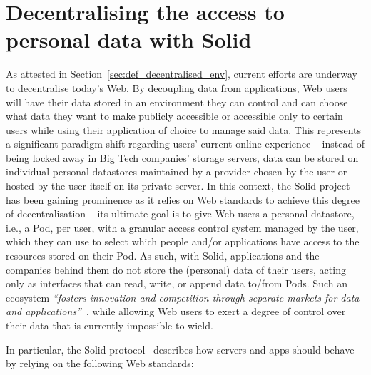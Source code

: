 \section{Decentralising the access to personal data with Solid}
\label{sec:sota_solid}

As attested in Section~\ref{sec:def_decentralised_env}, current efforts are underway to decentralise today's Web. By decoupling data from applications, Web users will have their data stored in an environment they can control and can choose what data they want to make publicly accessible or accessible only to certain users while using their application of choice to manage said data.
This represents a significant paradigm shift regarding users' current online experience -- instead of being locked away in Big Tech companies' storage servers, data can be stored on individual personal datastores maintained by a provider chosen by the user or hosted by the user itself on its private server.
In this context, the Solid project~\citep{sambra_solid_2016,mansour_demonstration_2016} has been gaining prominence as it relies on Web standards to achieve this degree of decentralisation -- its ultimate goal is to give Web users a personal datastore, i.e., a Pod, per user, with a granular access control system managed by the user, which they can use to select which people and/or applications have access to the resources stored on their Pod.
As such, with Solid, applications and the companies behind them do not store the (personal) data of their users, acting only as interfaces that can read, write, or append data to/from Pods.
Such an ecosystem \textit{``fosters innovation and competition through separate markets for data and applications''}~\citep{verborgh_paradigm_2017}, while allowing Web users to exert a degree of control over their data that is currently impossible to wield.

In particular, the Solid protocol~\citep{capadisli_solid_2022} describes how servers and apps should behave by relying on the following Web standards:

